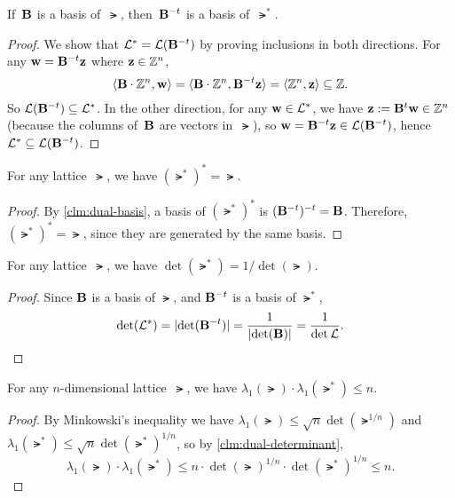\documentclass[11pt]{article}
\begin{document}
\begin{claim}
  \label{clm:dual-basis}
  If~$\mathbf{B}$ is a basis of~$\lat$, then~$\mathbf{B}^{-t}$ is a basis
  of~$\lat^*$.
\end{claim}

\begin{proof}
  We show that $\mathcal{L}^{*} = \mathcal{L}(\mathbf{B}^{-t})$ by proving inclusions in
  both directions. For any $\mathbf{w} = \mathbf{B}^{-t} \mathbf{z}$ where
  $\mathbf{z} \in \mathbb{Z}^n$,
  \[ \langle\mathbf{B} \cdot \mathbb{Z}^n, \mathbf{w}\rangle = \langle\mathbf{B} \cdot
      \mathbb{Z}^n,\mathbf{B}^{-t} \mathbf{z}\rangle = \langle\mathbb{Z}^n,\mathbf{z}\rangle \subseteq \mathbb{Z}. \] So
  $\mathcal{L}(\mathbf{B}^{-t}) \subseteq \mathcal{L}^*$. In the other direction, for any
  $\mathbf{w} \in \mathcal{L}^*$, we have $\mathbf{z} := \mathbf{B}^{t}\mathbf{w} \in \mathbb{Z}^{n}$
  (because the columns of~$\mathbf{B}$ are vectors in~$\lat$), so
  $\mathbf{w} = \mathbf{B}^{-t} \mathbf{z} \in \mathcal{L}(\mathbf{B}^{-t})$, hence
  $\mathcal{L}^* \subseteq \mathcal{L}(\mathbf{B}^{-t})$.
\end{proof}

\begin{claim}
  For any lattice~$\lat$, we have $(\lat^*)^* = \lat$.
\end{claim}

\begin{proof}
  By \cref{clm:dual-basis}, a basis of $(\lat^*)^*$ is
  $(\mathbf{B}^{-t})^{-t} = \mathbf{B}$. Therefore, $(\lat^*)^{*} = \lat$, since
  they are generated by the same basis.
\end{proof}

\begin{claim}
  \label{clm:dual-determinant}
  For any lattice~$\lat$, we have $\det(\lat^*) = 1/\det(\lat)$.
\end{claim}

\begin{proof}
  Since $\mathbf{B}$ is a basis of $\lat$, and $\mathbf{B}^{-t}$ is a basis of
  $\lat^*$,
  \[ \det(\mathcal{L}^*) = \lvert\det(\mathbf{B}^{-t})\rvert = \frac{1}{\lvert\det(\mathbf{B})\rvert} =
    \frac{1}{\det{\mathcal{L}}}.\]
\end{proof}

\begin{claim}
  For any $n$-dimensional lattice~$\lat$, we have
  $\lambda_1(\lat) \cdot \lambda_1(\lat^*) \leq n$.
\end{claim}

\begin{proof}
  By Minkowski's inequality we have
  $\lambda_1(\lat) \leq \sqrt{n} \det(\lat^{1/n})$ and
  $\lambda_1(\lat^*) \leq \sqrt{n}\det(\lat^*)^{1/n}$, so by
  \cref{clm:dual-determinant},
  \[ \lambda_{1}(\lat) \cdot \lambda_{1}(\lat^{*}) \leq n \cdot
    \det(\lat)^{1/n} \cdot \det(\lat^*)^{1/n} \leq n . \]
\end{proof}
\end{document}
